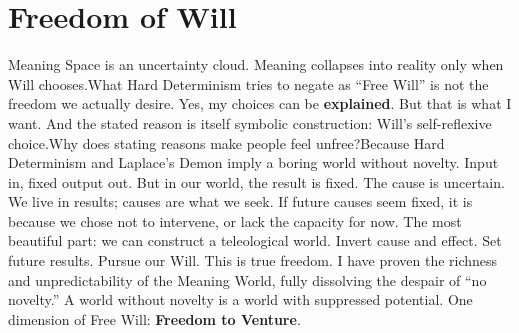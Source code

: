 \documentclass[11pt]{article}
\renewcommand{\\}[1][\mynewlineskip]{\oldnewline[#1]}
\begin{document}
\section{Freedom of Will}
Meaning Space is an uncertainty cloud. Meaning collapses into reality only when Will chooses.\\
What Hard Determinism tries to negate as ``Free Will'' is not the freedom we actually desire. Yes, my choices can be \textbf{explained}. But that is what I want. And the stated reason is itself symbolic construction: Will's self-reflexive choice.\\
Why does stating reasons make people feel unfree?\\
Because Hard Determinism and Laplace's Demon imply a boring world without novelty. Input in, fixed output out. But in our world, the result is fixed. The cause is uncertain. We live in results; causes are what we seek. If future causes seem fixed, it is because we chose not to intervene, or lack the capacity for now. The most beautiful part: we can construct a teleological world. Invert cause and effect. Set future results. Pursue our Will. This is true freedom. I have proven the richness and unpredictability of the Meaning World, fully dissolving the despair of ``no novelty.'' A world without novelty is a world with suppressed potential. One dimension of Free Will: \textbf{Freedom to Venture}.
\end{document}
